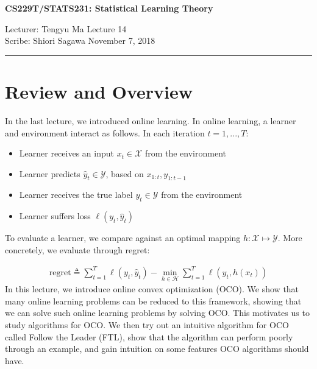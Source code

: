 \documentclass[11pt]{article}
\newcommand{\draftnotice}{\vbox to 0.25in{\noindent
   \raisebox{0.6in}[0in][0in]{\makebox[\textwidth][r]{\it
    DRAFT --- a final version will be posted shortly}}}
   \vspace{-.25in}\vspace{-\baselineskip}
}
\newcommand{\1}{\mathbb{I}} %
\begin{document}
\thispagestyle{empty}


\begin{center}
\bf\large CS229T/STATS231: Statistical Learning Theory
\end{center}

\noindent
Lecturer: Tengyu Ma
\hfill
Lecture 14
\\
Scribe: Shiori Sagawa
\hfill
November 7, 2018

\noindent
\rule{\textwidth}{1pt}

\medskip

\section{Review and Overview}
In the last lecture, we introduced online learning. In online learning, a learner and environment interact as follows. In each iteration $t=1,...,T$:
\begin{itemize}
	\item Learner receives an input $x_t \in \mathcal{X}$ from the environment
	\item Learner predicts $\hat{y}_t \in \mathcal{Y}$, based on $x_{1:t}, y_{1:t-1}$
	\item Learner receives the true label $y_t \in \mathcal{Y}$ from the environment
	\item Learner suffers loss $\ell(y_t, \hat{y}_t)$
\end{itemize}
To evaluate a learner, we compare against an optimal mapping $h: \mathcal{X} \mapsto \mathcal{Y}$. More concretely, we evaluate through regret:

\begin{align*}
\text{regret} \triangleq \sum_{t=1}^T\ell(y_t, \hat{y}_t) - \min_{h\in\mathcal{H}}\sum_{t=1}^T\ell(y_t, h(x_t))
\end{align*}
In this lecture, we introduce online convex optimization (OCO). We show that many online learning problems can be reduced to this framework, showing that we can solve such online learning problems by solving OCO. This motivates us to study algorithms for OCO. We then try out an intuitive algorithm for OCO called Follow the Leader (FTL), show that the algorithm can perform poorly through an example, and gain intuition on some features OCO algorithms should have. 
\end{document}
